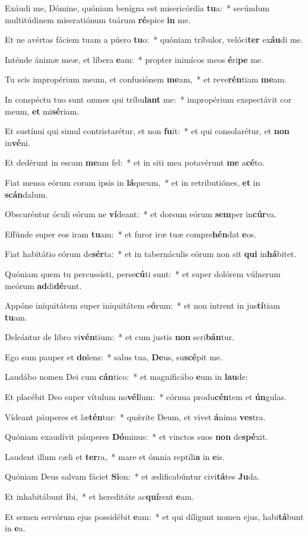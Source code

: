 \item Exáudi me, Dómine, quóniam benígna est misericórdia \textbf{tu}a:~* secúndum multitúdinem miseratiónum tuárum \textbf{ré}spice \textbf{in} me.
\item Et ne avértas fáciem tuam a púero \textbf{tu}o:~* quóniam tríbulor, velóci\textbf{ter} ex\textbf{áu}di me.
\item Inténde ánimæ meæ, et líbera \textbf{e}am:~* propter inimícos meos \textbf{é}ri\textbf{pe} me.
\item Tu scis impropérium meum, et confusiónem \textbf{me}am,~* et reve\textbf{rén}tiam \textbf{me}am.
\item In conspéctu tuo sunt omnes qui tríbu\textbf{lant} me:~* impropérium exspectávit cor meum, \textbf{et} mi\textbf{sé}riam.
\item Et sustínui qui simul contristarétur, et non \textbf{fu}it:~* et qui consolarétur, et \textbf{non} in\textbf{vé}ni.
\item Et dedérunt in escam \textbf{me}am fel:~* et in siti mea potavérunt \textbf{me} a\textbf{cé}to.
\item Fiat mensa eórum coram ipsis in \textbf{lá}queum,~* et in retributiónes, \textbf{et} in \textbf{scán}dalum.
\item Obscuréntur óculi eórum ne \textbf{ví}deant:~* et dorsum eórum \textbf{sem}per in\textbf{cúr}va.
\item Effúnde super eos iram \textbf{tu}am:~* et furor iræ tuæ compre\textbf{hén}dat \textbf{e}os.
\item Fiat habitátio eórum de\textbf{sér}ta:~* et in tabernáculis eórum non sit \textbf{qui} in\textbf{há}bitet.
\item Quóniam quem tu percussísti, perse\textbf{cú}ti sunt:~* et super dolórem vúlnerum meórum \textbf{ad}di\textbf{dé}runt.
\item Appóne iniquitátem super iniquitátem e\textbf{ó}rum:~* et non intrent in jus\textbf{tí}tiam \textbf{tu}am.
\item Deleántur de libro vi\textbf{vén}tium:~* et cum justis \textbf{non} scri\textbf{bán}tur.
\item Ego sum pauper et \textbf{do}lens:~* salus tua, \textbf{De}us, su\textbf{scé}pit me.
\item Laudábo nomen Dei cum \textbf{cán}tico:~* et magnificábo \textbf{e}um in \textbf{lau}de:
\item Et placébit Deo super vítulum no\textbf{vél}lum:~* córnua produ\textbf{cén}tem et \textbf{ún}gulas.
\item Vídeant páuperes et læ\textbf{tén}tur:~* quǽrite Deum, et vivet \textbf{á}nima \textbf{ves}tra.
\item Quóniam exaudívit páuperes \textbf{Dó}minus:~* et vinctos suos \textbf{non} de\textbf{spé}xit.
\item Laudent illum cæli et \textbf{ter}ra,~* mare et ómnia reptíli\textbf{a} in \textbf{e}is.
\item Quóniam Deus salvam fáciet \textbf{Si}on:~* et ædificabúntur civi\textbf{tá}tes \textbf{Ju}da.
\item Et inhabitábunt \textbf{i}bi,~* et hereditáte ac\textbf{quí}rent \textbf{e}am.
\item Et semen servórum ejus possidébit \textbf{e}am:~* et qui díligunt nomen ejus, habi\textbf{tá}bunt in \textbf{e}a.
